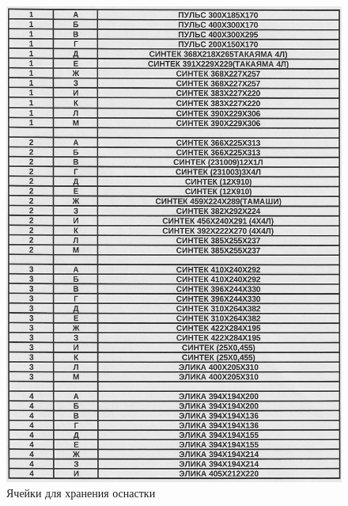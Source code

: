 \begin{figure}
\begin{center}
 \includegraphics[height=0.7\textheight, keepaspectratio]{Pics/II.5.7..jpg}
\end{center}
 \caption{Ячейки для хранения оснастки}
 \label{pic:II.5.7.}
\end{figure}


